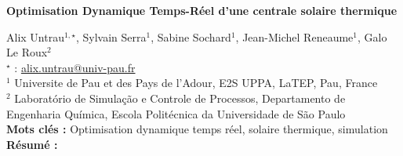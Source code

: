 


    \newpage

\BgThispage

%
\begin{flushleft}
\addtocounter{section}{1}
{\Large \textbf{Optimisation Dynamique Temps-Réel d'une centrale solaire thermique}}\label{ref:79}
\end{flushleft}
%
Alix Untrau$^{1,\star}$, Sylvain Serra$^{1}$, Sabine Sochard$^{1}$, Jean-Michel Reneaume$^{1}$, Galo Le Roux$^{2}$\\[2mm]
$^{\star}$ \Letter : \url{alix.untrau@univ-pau.fr}\\[2mm]
{\footnotesize $^{1}$ Universite de Pau et des Pays de l'Adour, E2S UPPA, LaTEP, Pau, France}\\
{\footnotesize $^{2}$ Laboratório de Simulação e Controle de Processos, Departamento de Engenharia Química, Escola Politécnica da Universidade de São Paulo}\\
[4mm]
%
\noindent \textbf{Mots clés : } Optimisation dynamique temps réel, solaire thermique, simulation\\[4mm]
%
\noindent \textbf{Résumé : } 


